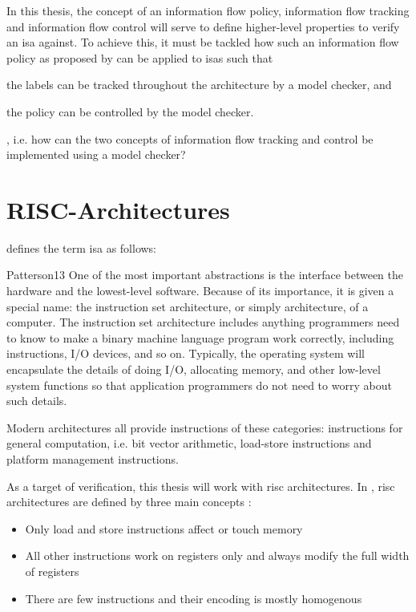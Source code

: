 In this thesis, the concept of an information flow policy, information flow tracking and information flow control will serve to define higher-level properties to verify an \gls{isa} against.
To achieve this, it must be tackled how such an information flow policy as proposed by \citeauthor{Ferraiuolo17} can be applied to \glspl{isa} such that \begin{enumerate*}[label=\alph*)]
    \item the labels can be tracked throughout the architecture by a model checker, and
    \item the policy can be controlled by the model checker.
\end{enumerate*}, i.e. how can the two concepts of information flow tracking and control be implemented using a model checker?

\section{RISC-Architectures}
\label{sec:riscs}

 defines the term \gls{isa} as follows:
\begin{displaycquote}[p.22]{Patterson13}
    One of the most important abstractions  is the interface between the hardware and the lowest-level software.
    Because of its importance, it is given a special name: the instruction set architecture, or simply architecture, of a computer.
    The instruction set architecture includes anything programmers need to know to make a binary machine language program work correctly, including instructions, I/O devices, and so on.
    Typically, the operating system will encapsulate the details of doing I/O, allocating memory, and other low-level system functions so that application programmers do not need to worry about such details.
\end{displaycquote}

Modern architectures all provide instructions of these categories: instructions for general computation, i.e. bit vector arithmetic, load-store instructions and platform management instructions.

As a target of verification, this thesis will work with \gls{risc} architectures.
In , \gls{risc} architectures are defined by three main concepts \cite[p.C-4]{Hennessy12}:
\begin{itemize}
    \item Only load and store instructions affect or touch memory
    \item All other instructions work on registers only and always modify the full width of registers
    \item There are few instructions and their encoding is mostly homogenous
\end{itemize}

